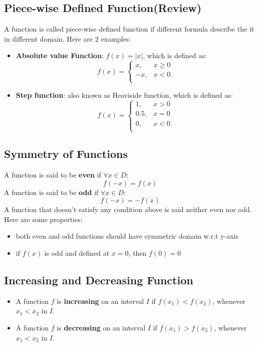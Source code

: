 \documentclass[10pt,a4paper,oneside]{article}
\begin{document}
\subsection{Piece-wise Defined Function(Review)}
A function is called piece-wise defined function if different formula describe the it in different domain. Here are $2$ examples:
\begin{itemize}
	\item \textbf{Absolute value Function}: $f(x) = |x|$, which is defined as:
	\[
	f(x) = \left\{
	\begin{array}{ll}
	x, & x \geq 0 \\
	-x, & x < 0. \\
	\end{array}\right.
	\]
	\item \textbf{Step function}: also known as Heaviside function, which is defined as:
	\[
	f(x) = \left\{
	\begin{array}{ll}
	1, & x > 0 \\
	0.5, & x = 0\\
	0, & x < 0. \\
	\end{array}\right.
	\]
\end{itemize}

\subsection{Symmetry of Functions}
A function is said to be \textbf{even} if $\forall x \in D$:
\[
f(-x) = f(x)
\]
A function is said to be \textbf{odd} if $\forall x \in D$:
\[
f(-x) = -f(x)
\]
A function that doesn't satisfy any condition above is said neither even nor odd. Here are some properties:
\begin{itemize}
	\item both even and odd functions should have symmetric domain w.r.t y-axis
	\item if $f(x)$ is odd and defined at $x=0$, then $f(0)=0$
\end{itemize}

\subsection{Increasing and Decreasing Function}
\begin{itemize}
	\item A function $f$ is \textbf{increasing} on an interval $I$ if $f(x_1) < f(x_2)$, whenever $x_1<x_2$ in $I$.
	\item A function $f$ is \textbf{decreasing} on an interval $I$ if $f(x_1) > f(x_2)$, whenever $x_1<x_2$ in $I$.
\end{itemize}
\end{document}
